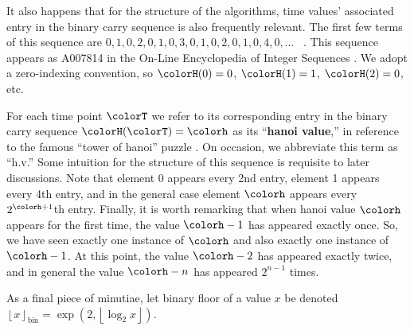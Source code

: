 It also happens that for the structure of the algorithms, time values' associated entry in the binary carry sequence is also frequently relevant.
The first few terms of this sequence are $0, 1, 0, 2, 0, 1, 0, 3, 0, 1, 0, 2, 0, 1, 0, 4, 0, \ldots$ \, .
This sequence appears as A007814 in the On-Line Encyclopedia of Integer Sequences \citep{oeis}.
We adopt a zero-indexing convention, so $\colorH(0) = 0$, $\colorH(1) = 1$, $\colorH(2) = 0$, etc.

For each time point $\colorT$ we refer to its corresponding entry in the binary carry sequence $\colorH(\colorT) = \colorh$ as its ``\textbf{hanoi value},'' in reference to the famous ``tower of hanoi'' puzzle \citep{lucas1889jeux}.
On occasion, we abbreviate this term as ``h.v.''
Some intuition for the structure of this sequence is requisite to later discussions.
Note that element 0 appears every 2nd entry, element 1 appears every 4th entry, and in the general case element $\colorh$ appears every $2^{\colorh+1}$th entry.
Finally, it is worth remarking that when hanoi value $\colorh$ appears for the first time, the value $\colorh - 1$ has appeared exactly once.
So, we have seen exactly one instance of $\colorh$ and also exactly one instance of $\colorh - 1$.
At this point, the value $\colorh - 2$ has appeared exactly twice, and in general the value $\colorh - n$ has appeared $2^{n - 1}$ times.

As a final piece of minutiae, let binary floor of a value $x$ be denoted $\left\lfloor x \right\rfloor_\mathrm{bin} = \exp(2, \left\lfloor \log_2 x \right\rfloor)$.
